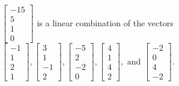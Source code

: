\begin{exercise}
\begin{exerciseStatement}
  \end{exerciseStatement}
  \begin{exerciseAnswer}
   \(\left[\begin{array}{c}
-15 \\
5 \\
1 \\
0
\end{array}\right]\) 
  	 is  
	a linear combination of the vectors \(\left[\begin{array}{c}
-1 \\
1 \\
2 \\
1
\end{array}\right] , \left[\begin{array}{c}
3 \\
1 \\
-1 \\
2
\end{array}\right] , \left[\begin{array}{c}
-5 \\
2 \\
-2 \\
0
\end{array}\right] , \left[\begin{array}{c}
4 \\
1 \\
4 \\
2
\end{array}\right] , \text{ and } \left[\begin{array}{c}
-2 \\
0 \\
4 \\
-2
\end{array}\right]\).

	
  


  \end{exerciseAnswer}
\end{exercise}